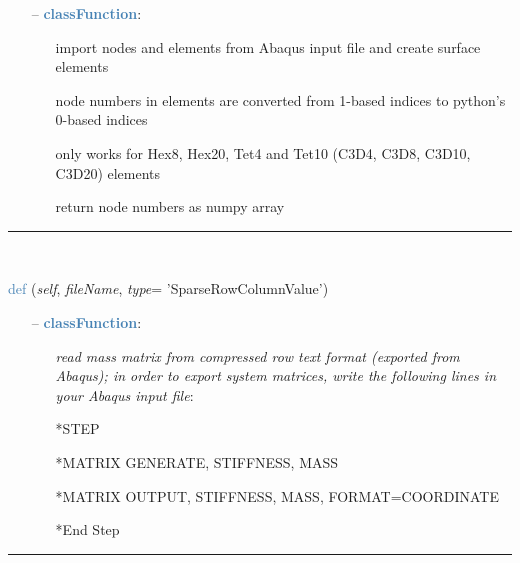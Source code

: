 \begin{itemize}[leftmargin=1.4cm]
\begin{itemize}[leftmargin=0.5cm]
\begin{itemize}[leftmargin=1.4cm]
\begin{itemize}[leftmargin=1.4cm]
\begin{itemize}[leftmargin=0.5cm]
\begin{itemize}[leftmargin=0.7cm]
  \item[--]  \textcolor{steelblue}{\bf classFunction}: \vspace{-6pt}
  \begin{itemize}[leftmargin=1.2cm]
\setlength{\itemindent}{-0.7cm}
    \item[] import nodes and elements from Abaqus input file and create surface elements
    \item[] node numbers in elements are converted from 1-based indices to python's 0-based indices
    \item[] only works for Hex8, Hex20, Tet4 and Tet10 (C3D4, C3D8, C3D10, C3D20) elements
    \item[] return node numbers as numpy array
  \end{itemize}
\vspace{12pt}\end{itemize}
%
\noindent\rule{8cm}{0.75pt}\vspace{1pt} \\ 
\begin{flushleft}
\noindent \textcolor{steelblue}{def {\bf {}}}\label{sec:FEM:FEMinterface:ReadMassMatrixFromAbaqus}
({\it self}, {\it fileName}, {\it type}= 'SparseRowColumnValue')
\end{flushleft}
\setlength{\itemindent}{0.7cm}
\begin{itemize}[leftmargin=0.7cm]
  \item[--]  \textcolor{steelblue}{\bf classFunction}: \vspace{-6pt}
  \begin{itemize}[leftmargin=1.2cm]
\setlength{\itemindent}{-0.7cm}
    \item[] {\it read mass matrix from compressed row text format (exported from Abaqus); in order to export system matrices, write the following lines in your Abaqus input file}:
    \item[] *STEP
    \item[] *MATRIX GENERATE, STIFFNESS, MASS
    \item[] *MATRIX OUTPUT, STIFFNESS, MASS, FORMAT=COORDINATE
    \item[] *End Step
  \end{itemize}
\vspace{12pt}\end{itemize}
%
\noindent\rule{8cm}{0.75pt}\vspace{1pt} \\ 

\end{itemize}
\end{itemize}
\end{itemize}
\end{itemize}
\end{itemize}
